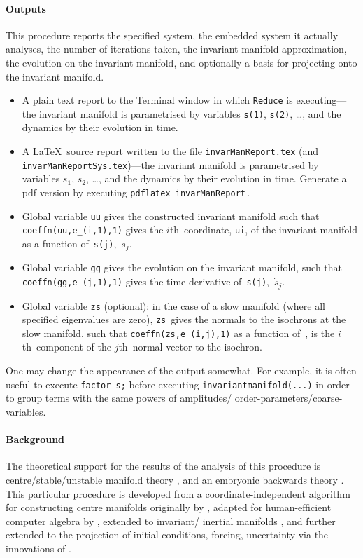\documentclass[11pt,a5paper]{article}
\begin{document}
\paragraph{Outputs}  This procedure reports the specified
system, the embedded system it actually analyses, the number
of iterations taken, the invariant manifold approximation,
the evolution on the invariant manifold, and optionally a
basis for projecting onto the invariant manifold.
\begin{itemize}
\item A plain text report to the Terminal window in which
\verb|Reduce| is executing---the invariant manifold is
parametrised by variables \verb|s(1)|, \verb|s(2)|, \ldots,
and the dynamics by their evolution in time.

\item A \LaTeX\ source report written to the file
\verb|invarManReport.tex| (and
\verb|invarManReportSys.tex|)---the invariant manifold is
parametrised by variables \(s_1\), \(s_2\), \ldots, and the
dynamics by their evolution in time.  Generate a pdf version
by executing \verb|pdflatex invarManReport|\,.

\item Global variable \verb|uu| gives the constructed 
invariant manifold such that \verb|coeffn(uu,e_(i,1),1)| 
gives the \(i\)th~coordinate, \verb|ui|, of the invariant 
manifold as a function of~\verb|s(j)|,~\(s_j\).

\item Global variable \verb|gg| gives the evolution on the 
invariant manifold, such that \verb|coeffn(gg,e_(j,1),1)| 
gives the time derivative of~\verb|s(j)|,~\(\dot s_j\).

\item Global variable \verb|zs| (optional): in the case of 
a slow manifold (where all specified eigenvalues are zero), 
\verb|zs|~gives the normals to the isochrons at the slow 
manifold, such that \verb|coeffn(zs,e_(i,j),1)| as a 
function of~\sv, is the \(i\)th~component of the 
\(j\)th~normal vector to the isochron.

\end{itemize}
One may change the appearance of the output somewhat. For
example, it is often useful to execute  \verb|factor s;|
before executing \verb|invariantmanifold(...)| in order to
group terms with the same powers of amplitudes\slash
order-parameters\slash coarse-variables.


\paragraph{Background}
The theoretical support for the results of the analysis of
this procedure is centre\slash stable\slash unstable
manifold theory \cite[e.g.,][]{Carr81, Haragus2011,
Roberts2014a}, and an embryonic backwards theory
\cite[]{Roberts2018a}. This particular procedure is
developed from a coordinate-independent algorithm for
constructing centre manifolds originally by
\cite{Coullet83}, adapted for human-efficient computer
algebra by \cite{Roberts96a}, extended to invariant\slash
inertial manifolds \cite[]{Roberts89, Foias88b}, and further
extended to the projection of initial conditions, forcing,
uncertainty via the innovations of \cite{Roberts89b,
Roberts97b}.
\end{document}
